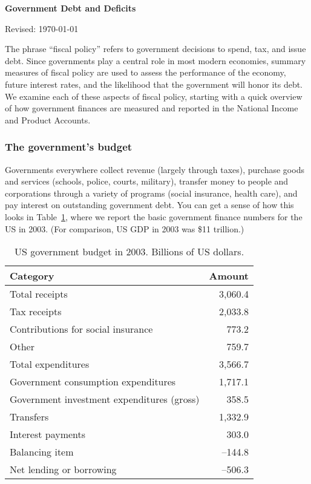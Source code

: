 \documentclass[letterpaper,12pt]{article}
\newcommand{\hsp}{\hspace{0.25in}}
\def\HeadName{Government Debt and Deficits}
\begin{document}
\thispagestyle{empty}%
\Head

\centerline{\large \bf \HeadName}%
\centerline{Revised: \today}

\bigskip
The phrase ``fiscal policy'' refers to government decisions 
to spend, tax, and issue debt.  
Since governments play a central role in most modern economies, 
summary measures of fiscal policy are used to assess the
performance of the economy, future interest rates, 
and the likelihood that the government will honor its debt.  
We examine each of these aspects of fiscal policy, starting with
a quick overview of how government finances are measured and reported in the National Income and Product Accounts.


\subsubsection*{The government's budget}

Governments everywhere collect revenue (largely through taxes), purchase goods and services (schools, police, courts, military), 
transfer money to people and corporations through a variety of
programs (social insurance, health care),   
and pay interest on outstanding government debt.  
You can get a sense of how this looks in Table~\ref{tab:usdef}, where we report the basic government finance numbers for the US in 2003.  (For comparison, US GDP in 2003 was \$11 trillion.)

\begin{table}[h]
\centering \tabcolsep=0.2in
\begin{tabular}{lr}
\hline\hline Category  &  Amount \\
\hline\hline

{Total receipts}        &      3,060.4 \\
\hsp Tax receipts              &      2,033.8     \\
\hsp Contributions for social insurance        &   773.2     \\
\hsp Other              &          759.7      \\

\hline

{Total expenditures}    &    3,566.7    \\
\hsp Government consumption expenditures             &      1,717.1          \\
\hsp Government investment expenditures (gross)             &    358.5            \\
\hsp Transfers            &       1,332.9         \\
\hsp Interest payments             &    303.0            \\
\hsp Balancing item              &           --144.8     \\

\hline

Net lending or borrowing   &     --506.3  \\

\hline\hline
\end{tabular}
\caption{US government budget in 2003. Billions of US dollars.}
\label{tab:usdef}
\end{table}
\end{document}
